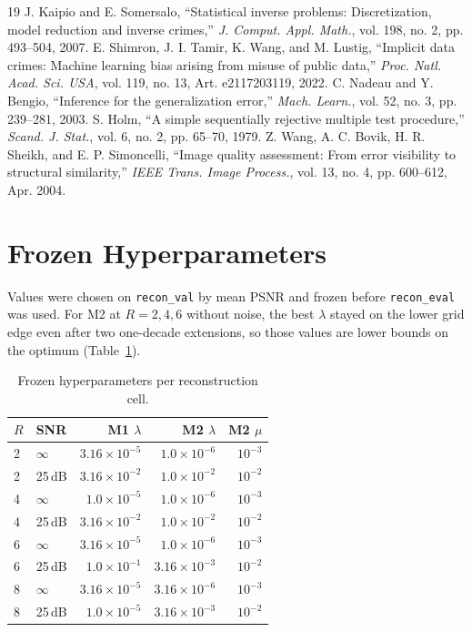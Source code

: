 \documentclass[conference,a4paper]{IEEEtran}
\begin{document}
\begin{thebibliography}{19}
 J. Kaipio and E. Somersalo, ``Statistical inverse problems: Discretization, model reduction and inverse crimes,'' \emph{J. Comput. Appl. Math.}, vol. 198, no. 2, pp. 493--504, 2007.
 E. Shimron, J. I. Tamir, K. Wang, and M. Lustig, ``Implicit data crimes: Machine learning bias arising from misuse of public data,'' \emph{Proc. Natl. Acad. Sci. USA}, vol. 119, no. 13, Art. e2117203119, 2022.
 C. Nadeau and Y. Bengio, ``Inference for the generalization error,'' \emph{Mach. Learn.}, vol. 52, no. 3, pp. 239--281, 2003.
 S. Holm, ``A simple sequentially rejective multiple test procedure,'' \emph{Scand. J. Stat.}, vol. 6, no. 2, pp. 65--70, 1979.
 Z. Wang, A. C. Bovik, H. R. Sheikh, and E. P. Simoncelli, ``Image quality assessment: From error visibility to structural similarity,'' \emph{IEEE Trans. Image Process.}, vol. 13, no. 4, pp. 600--612, Apr. 2004.
\end{thebibliography}

\clearpage
\appendices
\section{Frozen Hyperparameters}
Values were chosen on \texttt{recon\_val} by mean PSNR and frozen before \texttt{recon\_eval} was used. For M2 at $R=2,4,6$ without noise, the best $\lambda$ stayed on the lower grid edge even after two one-decade extensions, so those values are lower bounds on the optimum (Table~\ref{tab:hyper}).

\begin{table}[h!]
\centering
\caption{Frozen hyperparameters per reconstruction cell.}
\label{tab:hyper}
\footnotesize
\begin{tabular}{@{}llrrr@{}}
\toprule
$R$ & SNR & M1 $\lambda$ & M2 $\lambda$ & M2 $\mu$\\
\midrule
2 & $\infty$ & $3.16\times10^{-5}$ & $1.0\times10^{-6}$ & $10^{-3}$\\
2 & 25\,dB & $3.16\times10^{-2}$ & $1.0\times10^{-2}$ & $10^{-2}$\\
4 & $\infty$ & $1.0\times10^{-5}$ & $1.0\times10^{-6}$ & $10^{-3}$\\
4 & 25\,dB & $3.16\times10^{-2}$ & $1.0\times10^{-2}$ & $10^{-2}$\\
6 & $\infty$ & $3.16\times10^{-5}$ & $1.0\times10^{-6}$ & $10^{-3}$\\
6 & 25\,dB & $1.0\times10^{-1}$ & $3.16\times10^{-3}$ & $10^{-2}$\\
8 & $\infty$ & $3.16\times10^{-5}$ & $3.16\times10^{-6}$ & $10^{-3}$\\
8 & 25\,dB & $1.0\times10^{-5}$ & $3.16\times10^{-3}$ & $10^{-2}$\\
\bottomrule
\end{tabular}
\end{table}
\end{document}
